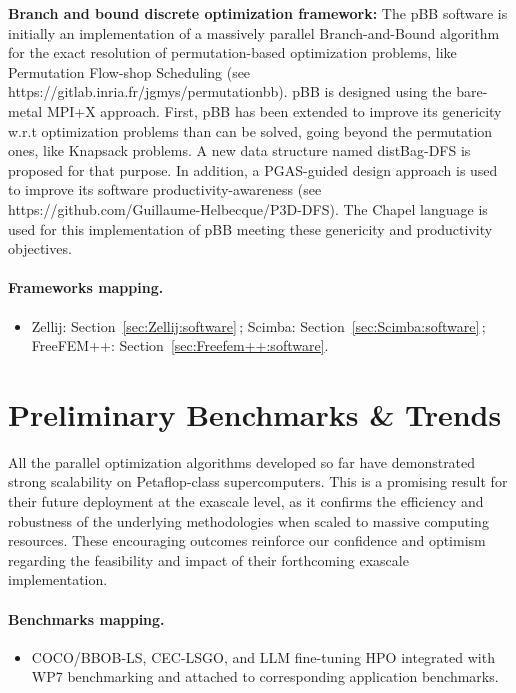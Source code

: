 \medskip

{\bf Branch and bound discrete optimization framework:} The pBB software is initially an implementation of a massively parallel Branch-and-Bound algorithm for
the exact resolution of permutation-based optimization problems, like Permutation Flow-shop
Scheduling (see https://gitlab.inria.fr/jgmys/permutationbb). pBB is designed using
the bare-metal MPI+X approach. First, pBB has been extended to improve its genericity w.r.t
optimization problems than can be solved, going beyond the permutation ones, like Knapsack
problems. A new data structure named distBag-DFS is proposed for that purpose. In addition,
a PGAS-guided design approach is used to improve its software productivity-awareness (see
https://github.com/Guillaume-Helbecque/P3D-DFS). The Chapel language is used for this
implementation of pBB meeting these genericity and productivity objectives.

\medskip


\paragraph{Frameworks mapping.}
\begin{itemize}
	\item Zellij: Section~\ref{sec:Zellij:software}\,; Scimba: Section~\ref{sec:Scimba:software}\,; FreeFEM++: Section~\ref{sec:Freefem++:software}.
\end{itemize}

\section{Preliminary Benchmarks \& Trends}

All the parallel optimization algorithms developed so far have demonstrated strong scalability on Petaflop-class supercomputers. This is a promising result for their future deployment at the exascale level, as it confirms the efficiency and robustness of the underlying methodologies when scaled to massive computing resources. These encouraging outcomes reinforce our confidence and optimism regarding the feasibility and impact of their forthcoming exascale implementation.

\paragraph{Benchmarks mapping.}
\begin{itemize}
	\item COCO/BBOB-LS, CEC-LSGO, and LLM fine-tuning HPO integrated with WP7 benchmarking and attached to corresponding application benchmarks.
\end{itemize}

